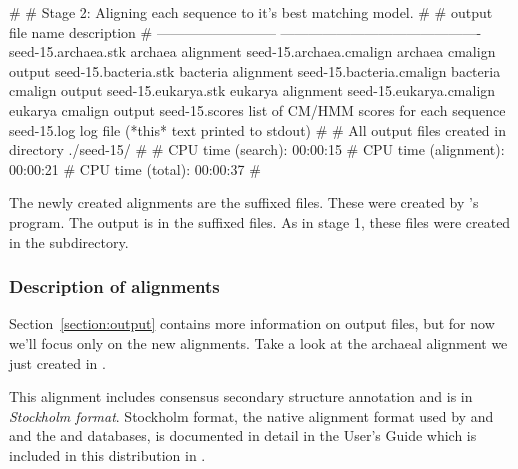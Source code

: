 \newpage

\begin{sreoutput}
#
# Stage 2: Aligning each sequence to it's best matching model.
#
# output file name            description
# --------------------------  -------------------------------------------
  seed-15.archaea.stk         archaea alignment
  seed-15.archaea.cmalign     archaea cmalign output
  seed-15.bacteria.stk        bacteria alignment
  seed-15.bacteria.cmalign    bacteria cmalign output
  seed-15.eukarya.stk         eukarya alignment
  seed-15.eukarya.cmalign     eukarya cmalign output
  seed-15.scores              list of CM/HMM scores for each sequence
  seed-15.log                 log file (*this* text printed to stdout)
#
# All output files created in directory ./seed-15/
#
# CPU time (search):     00:00:15
# CPU time (alignment):  00:00:21
# CPU time (total):      00:00:37
#
\end{sreoutput}

The newly created alignments are the  suffixed files. These
were created by 's  program. The
 output is in the  suffixed files.  As in
stage 1, these files were created in the 
subdirectory. 

\subsubsection{Description of alignments}

Section~\ref{section:output} contains more information
on  output files, but for now we'll focus only on the new
alignments.  Take a look at the archaeal alignment we just created in
.

This alignment includes consensus secondary structure annotation and
is in \emph{Stockholm format}. 
Stockholm format, the native alignment format used by  and
 and the  and 
databases, is documented in detail in the  User's
Guide which is included in this distribution in
.

